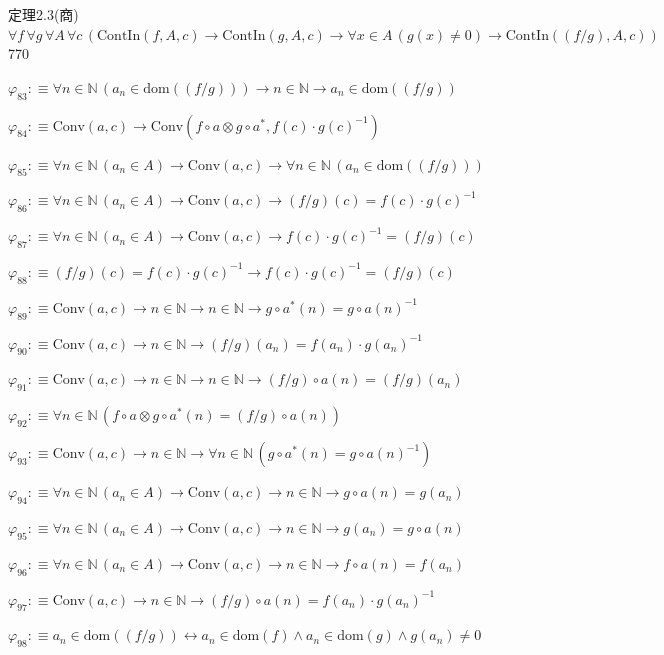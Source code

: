 \begin{fullproof}{定理2.3(商)}{$\forall f\,\forall g\,\forall A\,\forall c\,(\mathrm{ContIn}(f,A,c) \to \mathrm{ContIn}(g,A,c) \to \forall x \in A\,(g(x) \neq 0) \to \mathrm{ContIn}((f / g),A,c))$}{770}
\begin{abbrevlist}
\item $\varphi_{83} :\equiv \forall n \in \mathbb{N}\,(a_{n} \in \mathrm{dom}((f / g))) \to n \in \mathbb{N} \to a_{n} \in \mathrm{dom}((f / g))$
\item $\varphi_{84} :\equiv \mathrm{Conv}(a,c) \to \mathrm{Conv}(f \circ a \otimes g \circ a^{\ast},f(c) \cdot g(c)^{-1})$
\item $\varphi_{85} :\equiv \forall n \in \mathbb{N}\,(a_{n} \in A) \to \mathrm{Conv}(a,c) \to \forall n \in \mathbb{N}\,(a_{n} \in \mathrm{dom}((f / g)))$
\item $\varphi_{86} :\equiv \forall n \in \mathbb{N}\,(a_{n} \in A) \to \mathrm{Conv}(a,c) \to (f / g)(c) = f(c) \cdot g(c)^{-1}$
\item $\varphi_{87} :\equiv \forall n \in \mathbb{N}\,(a_{n} \in A) \to \mathrm{Conv}(a,c) \to f(c) \cdot g(c)^{-1} = (f / g)(c)$
\item $\varphi_{88} :\equiv (f / g)(c) = f(c) \cdot g(c)^{-1} \to f(c) \cdot g(c)^{-1} = (f / g)(c)$
\item $\varphi_{89} :\equiv \mathrm{Conv}(a,c) \to n \in \mathbb{N} \to n \in \mathbb{N} \to g \circ a^{\ast}(n) = g \circ a(n)^{-1}$
\item $\varphi_{90} :\equiv \mathrm{Conv}(a,c) \to n \in \mathbb{N} \to (f / g)(a_{n}) = f(a_{n}) \cdot g(a_{n})^{-1}$
\item $\varphi_{91} :\equiv \mathrm{Conv}(a,c) \to n \in \mathbb{N} \to n \in \mathbb{N} \to (f / g) \circ a(n) = (f / g)(a_{n})$
\item $\varphi_{92} :\equiv \forall n \in \mathbb{N}\,(f \circ a \otimes g \circ a^{\ast}(n) = (f / g) \circ a(n))$
\item $\varphi_{93} :\equiv \mathrm{Conv}(a,c) \to n \in \mathbb{N} \to \forall n \in \mathbb{N}\,(g \circ a^{\ast}(n) = g \circ a(n)^{-1})$
\item $\varphi_{94} :\equiv \forall n \in \mathbb{N}\,(a_{n} \in A) \to \mathrm{Conv}(a,c) \to n \in \mathbb{N} \to g \circ a(n) = g(a_{n})$
\item $\varphi_{95} :\equiv \forall n \in \mathbb{N}\,(a_{n} \in A) \to \mathrm{Conv}(a,c) \to n \in \mathbb{N} \to g(a_{n}) = g \circ a(n)$
\item $\varphi_{96} :\equiv \forall n \in \mathbb{N}\,(a_{n} \in A) \to \mathrm{Conv}(a,c) \to n \in \mathbb{N} \to f \circ a(n) = f(a_{n})$
\item $\varphi_{97} :\equiv \mathrm{Conv}(a,c) \to n \in \mathbb{N} \to (f / g) \circ a(n) = f(a_{n}) \cdot g(a_{n})^{-1}$
\item $\varphi_{98} :\equiv a_{n} \in \mathrm{dom}((f / g)) \leftrightarrow a_{n} \in \mathrm{dom}(f) \land a_{n} \in \mathrm{dom}(g) \land g(a_{n}) \neq 0$

\end{abbrevlist}
\end{fullproof}
